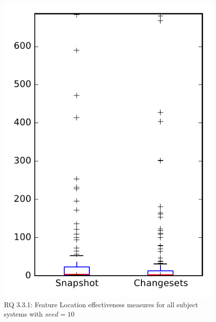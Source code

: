 
\begin{figure}
\centering
\includegraphics[height=0.4\textheight]{figures/flt_seed/rq1_overview_10}
\caption{RQ 3.3.1: Feature Location effectiveness measures for all subject systems with $seed=10$}
\label{fig:flt_seed:rq1:overview}
\end{figure}
